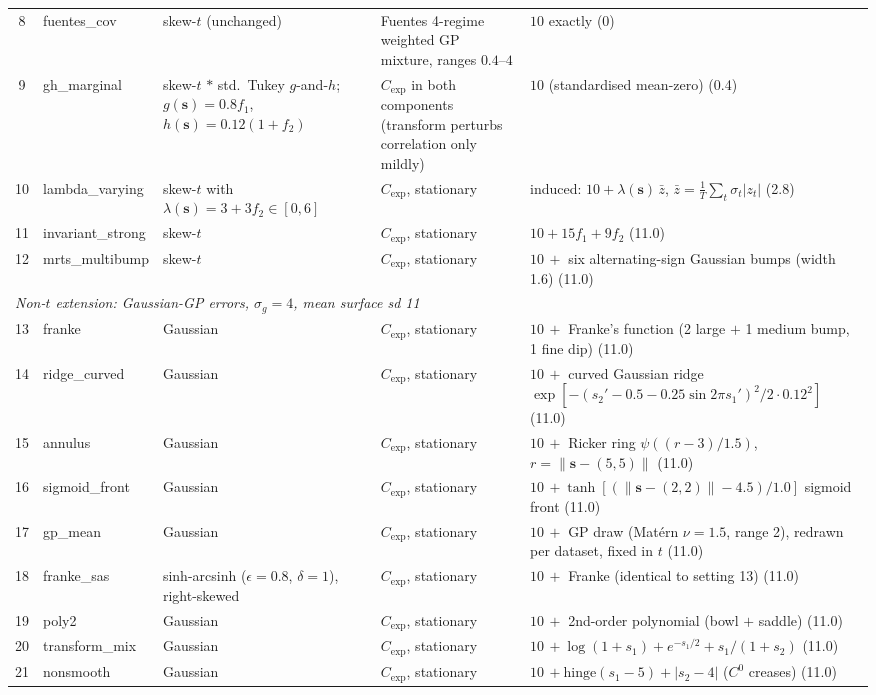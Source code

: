 \documentclass[11pt]{article}
\newcommand{\bs}{\boldsymbol{s}}
\begin{document}
\begin{table}[ht]
\begin{tabular}{clp{3.3cm}p{4.4cm}p{3.9cm}}
8  & fuentes\_cov      & skew-$t$ (unchanged) & Fuentes 4-regime weighted GP mixture, ranges $0.4$--$4$ & $10$ exactly \hfill (0) \\
9  & gh\_marginal      & skew-$t$ $\ast$ std.\ Tukey $g$-and-$h$; $g(\bs) = 0.8 f_1$, $h(\bs) = 0.12(1{+}f_2)$ & $C_{\mathrm{exp}}$ in both components (transform perturbs correlation only mildly) & $10$ (standardised mean-zero) \hfill (0.4) \\
10 & lambda\_varying   & skew-$t$ with $\lambda(\bs) = 3 + 3f_2 \in [0,6]$ & $C_{\mathrm{exp}}$, stationary & induced: $10 + \lambda(\bs)\,\bar z$, $\bar z = \frac{1}{T}\sum_t \sigma_t |z_t|$ \hfill (2.8) \\
11 & invariant\_strong & skew-$t$ & $C_{\mathrm{exp}}$, stationary & $10 + 15f_1 + 9f_2$ \hfill (11.0) \\
12 & mrts\_multibump   & skew-$t$ & $C_{\mathrm{exp}}$, stationary & $10\,+$ six alternating-sign Gaussian bumps (width 1.6) \hfill (11.0) \\
\midrule
\multicolumn{5}{l}{\emph{Non-$t$ extension: Gaussian-GP errors, $\sigma_g = 4$, mean surface sd 11}} \\
13 & franke         & Gaussian & $C_{\mathrm{exp}}$, stationary & $10\,+$ Franke's function (2 large $+$ 1 medium bump, 1 fine dip) \hfill (11.0) \\
14 & ridge\_curved  & Gaussian & $C_{\mathrm{exp}}$, stationary & $10\,+$ curved Gaussian ridge $\exp[-(s_2' - 0.5 - 0.25\sin 2\pi s_1')^2 / 2\cdot0.12^2]$ \hfill (11.0) \\
15 & annulus        & Gaussian & $C_{\mathrm{exp}}$, stationary & $10\,+$ Ricker ring $\psi((r-3)/1.5)$, $r = \lVert\bs - (5,5)\rVert$ \hfill (11.0) \\
16 & sigmoid\_front & Gaussian & $C_{\mathrm{exp}}$, stationary & $10\,+ \tanh[(\lVert\bs - (2,2)\rVert - 4.5)/1.0]$ sigmoid front \hfill (11.0) \\
17 & gp\_mean       & Gaussian & $C_{\mathrm{exp}}$, stationary & $10\,+$ GP draw (Mat\'ern $\nu{=}1.5$, range 2), redrawn per dataset, fixed in $t$ \hfill (11.0) \\
18 & franke\_sas    & sinh-arcsinh ($\epsilon{=}0.8$, $\delta{=}1$), right-skewed & $C_{\mathrm{exp}}$, stationary & $10\,+$ Franke (identical to setting 13) \hfill (11.0) \\
19 & poly2          & Gaussian & $C_{\mathrm{exp}}$, stationary & $10\,+$ 2nd-order polynomial (bowl $+$ saddle) \hfill (11.0) \\
20 & transform\_mix & Gaussian & $C_{\mathrm{exp}}$, stationary & $10\,+ \log(1{+}s_1) + e^{-s_1/2} + s_1/(1{+}s_2)$ \hfill (11.0) \\
21 & nonsmooth      & Gaussian & $C_{\mathrm{exp}}$, stationary & $10\,+ \mathrm{hinge}(s_1{-}5) + |s_2 - 4|$ ($C^0$ creases) \hfill (11.0) \\
\bottomrule
\end{tabular}
\end{table}
\end{document}
